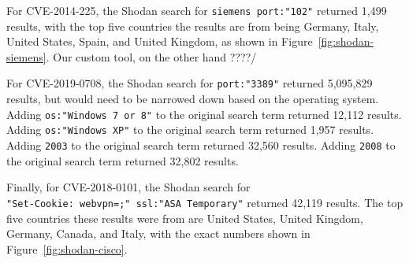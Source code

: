 For CVE-2014-225, the Shodan search for \verb|siemens port:"102"| returned
1,499 results, with the top five countries the results are from being
Germany, Italy, United States, Spain, and United Kingdom, as shown in
Figure~\ref{fig:shodan-siemens}. Our custom tool, on the other hand ????/

For CVE-2019-0708, the Shodan search for \verb|port:"3389"| returned
5,095,829 results, but would need to be narrowed down based on the operating
system. Adding \verb|os:"Windows 7 or 8"| to the original search term returned
12,112 results. Adding \verb|os:"Windows XP"| to the original search term
returned 1,957 results. Adding \verb|2003| to the original search term returned
32,560 results. Adding \verb|2008| to the original search term returned 32,802
results. 

Finally, for CVE-2018-0101, the Shodan search for\\
\verb|"Set-Cookie: webvpn=;" ssl:"ASA Temporary"| returned 42,119 results.
The top five countries these results were from are United States, United Kingdom,
Germany, Canada, and Italy, with the exact numbers shown in
Figure~\ref{fig:shodan-cisco}.
